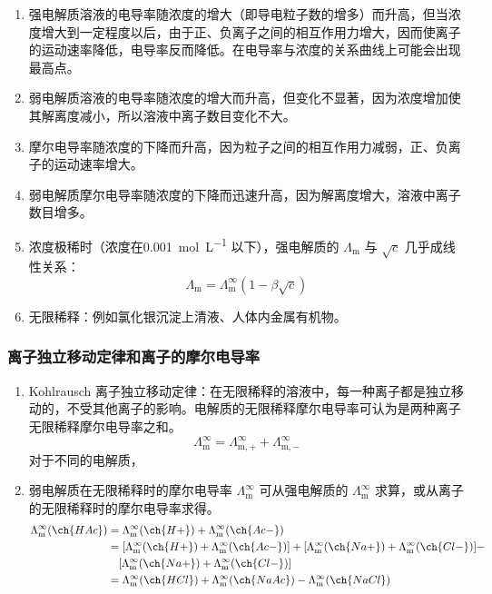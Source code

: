 \begin{enumerate}
    \item 强电解质溶液的电导率随浓度的增大（即导电粒子数的增多）而升高，但当浓度增大到一定程度以后，由于正、负离子之间的相互作用力增大，因而使离子的运动速率降低，电导率反而降低。在电导率与浓度的关系曲线上可能会出现最高点。
    \item 弱电解质溶液的电导率随浓度的增大而升高，但变化不显著，因为浓度增加使其解离度减小，所以溶液中离子数目变化不大。
    \item 摩尔电导率随浓度的下降而升高，因为粒子之间的相互作用力减弱，正、负离子的运动速率增大。
    \item 弱电解质摩尔电导率随浓度的下降而迅速升高，因为解离度增大，溶液中离子数目增多。
    \item 浓度极稀时（浓度在\qty{0.001}{\mole\per\liter} 以下），强电解质的 $\Lambda_{\mathrm{m}}$ 与 $\sqrt{c}$ 几乎成线性关系：
    \begin{equation}
        \Lambda_{\mathrm{m}} = \Lambda_{\mathrm{m}}^{\infty} (1 - \beta \sqrt{c})
    \end{equation}
    \item 无限稀释：例如氯化银沉淀上清液、人体内金属有机物。
\end{enumerate}

\subsubsection{离子独立移动定律和离子的摩尔电导率}

\begin{enumerate}
    \item Kohlrausch 离子独立移动定律：在无限稀释的溶液中，每一种离子都是独立移动的，不受其他离子的影响。电解质的无限稀释摩尔电导率可认为是两种离子无限稀释摩尔电导率之和。
    \begin{equation}
        \Lambda_{\mathrm{m}}^{\infty} = \Lambda_{\mathrm{m},+}^{\infty} + \Lambda_{\mathrm{m},-}^{\infty}
    \end{equation}
    对于不同的电解质，
    \item 弱电解质在无限稀释时的摩尔电导率 $\Lambda_{\mathrm{m}}^{\infty}$ 可从强电解质的 $\Lambda_{\mathrm{m}}^{\infty}$ 求算，或从离子的无限稀释时的摩尔电导率求得。
    \begin{equation*}
        \begin{aligned}
            \Lambda_{\mathrm{m}}^{\infty}(\ch{HAc}) &= \Lambda_{\mathrm{m}}^{\infty}(\ch{H+}) + \Lambda_{\mathrm{m}}^{\infty}(\ch{Ac-}) \\ 
            &= [\Lambda_{\mathrm{m}}^{\infty}(\ch{H+}) + \Lambda_{\mathrm{m}}^{\infty}(\ch{Ac-})] + [\Lambda_{\mathrm{m}}^{\infty}(\ch{Na+}) + \Lambda_{\mathrm{m}}^{\infty}(\ch{Cl-})] - \\
            &\quad [\Lambda_{\mathrm{m}}^{\infty}(\ch{Na+}) + \Lambda_{\mathrm{m}}^{\infty}(\ch{Cl-})] \\
            &= \Lambda_{\mathrm{m}}^{\infty}(\ch{HCl}) + \Lambda_{\mathrm{m}}^{\infty}(\ch{NaAc}) - \Lambda_{\mathrm{m}}^{\infty}(\ch{NaCl})
        \end{aligned}
    \end{equation*}
\end{enumerate}

